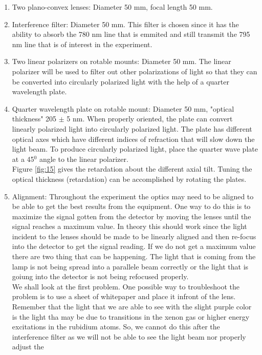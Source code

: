 \documentclass[twocolumn]{article}
\begin{document}
\begin{enumerate}[label=\alph*).]
\item Two plano-convex lenses: Diameter 50 mm, focal length 50 mm.
\item Interference filter: Diameter 50 mm. This filter is chosen since it has 
the ability to absorb the 780 nm line that is emmited and still transmit the 
795 nm line that is of interest in the experiment.
\item Two linear polarizers on rotable mounts: Diameter 50 mm. The linear 
polarizer will be used to filter out other polarizations of light so that they 
can be converted into circularly polarized light with the help of a quarter 
wavelength plate.
\item Quarter wavelength plate on rotable mount: Diameter 50 mm, "optical 
thickness" 205 $\pm$ 5 nm. When properly oriented, the plate can convert 
linearly polarized light into circularly polarized light. The plate has 
different optical axes which have different indices of refraction that will 
slow down the light beam. To produce circularly polarized light, place the 
quarter wave plate at a 45$^0$ angle to the linear polarizer.
\\
Figure \ref{fig:15} gives the retardation about the different axial tilt. 
Tuning the optical thickness (retardation) can be accomplished by rotating the 
plates.
\item Alignment: Throughout the experiment the optics may need to be aligned to 
be able to get the best results from the equipment. One way to do this is to 
maximize the signal gotten from the detector by moving the lenses until the 
signal reaches a maximum value. In theory this should work since the light 
incident to the lenses should be made to be linearly aligned and then re-focus 
into the detector to get the signal reading. If we do not get a maximum value 
there are two thing that can be happening. The light that is coming from the 
lamp is not being spread into a parallele beam correctly or the light that is 
goiung into the detector is not being refocused properly.
\\
We shall look at the first problem. One possible way to troubleshoot the 
problem is to use a sheet of whitepaper and place it infront of the lens. 
Remember that the light that we are able to see with the slight purple color 
is the light tha may be due to transitions in the xenon gas or higher energy 
excitations in the rubidium atoms. So, we cannot do this after the interference 
filter as we will not be able to see the light beam nor properly adjust the 

\end{enumerate}
\end{document}
